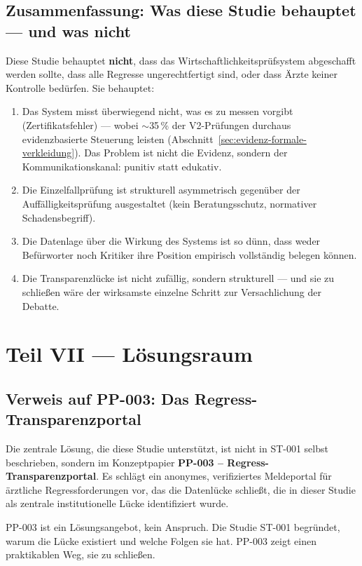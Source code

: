 \documentclass{umbruch-position}
\begin{document}
\subsection*{Zusammenfassung: Was diese Studie behauptet --- und was nicht}

Diese Studie behauptet \textbf{nicht}, dass das Wirtschaftlichkeitsprüfsystem abgeschafft werden sollte, dass alle Regresse ungerechtfertigt sind, oder dass Ärzte keiner Kontrolle bedürfen. Sie behauptet:

\begin{enumerate}[nosep]
  \item Das System misst überwiegend nicht, was es zu messen vorgibt (Zertifikatsfehler) --- wobei ${\sim}$35\,\% der V2-Prüfungen durchaus evidenzbasierte Steuerung leisten (Abschnitt~\ref{sec:evidenz-formale-verkleidung}). Das Problem ist nicht die Evidenz, sondern der Kommunikationskanal: punitiv statt edukativ.
  \item Die Einzelfallprüfung ist strukturell asymmetrisch gegenüber der Auffälligkeitsprüfung ausgestaltet (kein Beratungsschutz, normativer Schadensbegriff).
  \item Die Datenlage über die Wirkung des Systems ist so dünn, dass weder Befürworter noch Kritiker ihre Position empirisch vollständig belegen können.
  \item Die Transparenzlücke ist nicht zufällig, sondern strukturell --- und sie zu schließen wäre der wirksamste einzelne Schritt zur Versachlichung der Debatte.
\end{enumerate}


\section{Teil VII --- Lösungsraum}

\subsection{Verweis auf PP-003: Das Regress-Transparenzportal}

Die zentrale Lösung, die diese Studie unterstützt, ist nicht in ST-001 selbst beschrieben, sondern im Konzeptpapier \textbf{PP-003 -- Regress-Transparenzportal}. Es schlägt ein anonymes, verifiziertes Meldeportal für ärztliche Regressforderungen vor, das die Datenlücke schließt, die in dieser Studie als zentrale institutionelle Lücke identifiziert wurde.

PP-003 ist ein Lösungsangebot, kein Anspruch. Die Studie ST-001 begründet, warum die Lücke existiert und welche Folgen sie hat. PP-003 zeigt einen praktikablen Weg, sie zu schließen.
\end{document}

